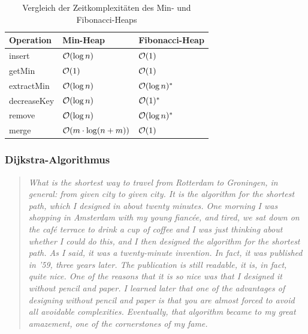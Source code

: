                 \begin{table}
                    \centering
                    \begin{tabular}{|l|l|l|} \hline
                        \textbf{Operation} & \textbf{Min-Heap} & \textbf{Fibonacci-Heap}\\ \hline
                        insert & $\mathcal{O}(\log n)$& $\mathcal{O}(1)$\\
                        getMin & $\mathcal{O}(1)$& $\mathcal{O}(1)$\\
                        extractMin & $\mathcal{O}(\log n)$ & $\mathcal{O}(\log n)^{*}$\\
                        decreaseKey & $\mathcal{O}(\log n)$ & $\mathcal{O}(1)^{*}$\\
                        remove & $\mathcal{O}(\log n)$ & $\mathcal{O}(\log n)^{*}$\\
                        merge& $\mathcal{O}(m \cdot \log(n+m))$ & $\mathcal{O}(1)$\\ \hline
                    \end{tabular}
                    \caption{Vergleich der Zeitkomplexitäten des Min- und Fibonacci-Heaps\\\cite{EZ:Web55}}
                    \label{tab:heap-time-complexities}
                \end{table}

            
            \subsubsection{Dijkstra-Algorithmus}
    
                \begin{quote}
                    \textit{What is the shortest way to travel from Rotterdam to Groningen, in general: from given city to given city. It is the algorithm for the shortest path, which I designed in about twenty minutes. One morning I was shopping in Amsterdam with my young fiancée, and tired, we sat down on the café terrace to drink a cup of coffee and I was just thinking about whether I could do this, and I then designed the algorithm for the shortest path. As I said, it was a twenty-minute invention. In fact, it was published in '59, three years later. The publication is still readable, it is, in fact, quite nice. One of the reasons that it is so nice was that I designed it without pencil and paper. I learned later that one of the advantages of designing without pencil and paper is that you are almost forced to avoid all avoidable complexities. Eventually, that algorithm became to my great amazement, one of the cornerstones of my fame.} \cite[Edsger W. Dijkstra, 2001]{EZ:Web47}
                \end{quote}
    
